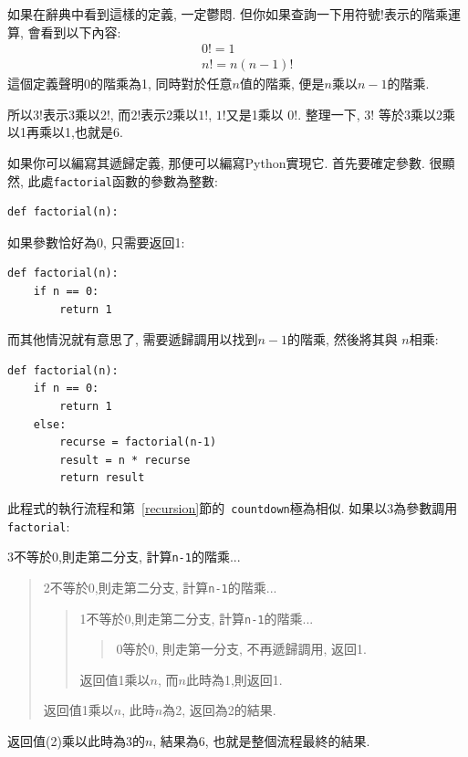 \documentclass[10pt]{book}
\begin{document}
如果在辭典中看到這樣的定義, 一定鬱悶. 
但你如果查詢一下用符號$!$表示的階乘運算, 
會看到以下內容:
%
\begin{eqnarray*}
&&  0! = 1 \\
&&  n! = n (n-1)!
\end{eqnarray*}
%
這個定義聲明0的階乘為1, 同時對於任意$n$值的階乘, 便是$n$乘以$n-1$的階乘. 

所以$3!$表示3乘以$2!$,  而$2!$表示2乘以$1!$, $1!$又是1乘以
$0!$. 整理一下, $3!$ 等於3乘以2乘以1再乘以1,也就是6.

如果你可以編寫其遞歸定義, 那便可以編寫Python實現它. 
首先要確定參數. 很顯然, 此處{\tt factorial}函數的參數為整數:

\begin{verbatim}
def factorial(n):
\end{verbatim}
%
如果參數恰好為0, 只需要返回1:

\begin{verbatim}
def factorial(n):
    if n == 0:
        return 1
\end{verbatim}
%
而其他情況就有意思了, 需要遞歸調用以找到$n-1$的階乘, 然後將其與
$n$相乘:

\begin{verbatim}
def factorial(n):
    if n == 0:
        return 1
    else:
        recurse = factorial(n-1)
        result = n * recurse
        return result
\end{verbatim}
%
此程式的執行流程和第~\ref{recursion}節的{\tt
countdown}極為相似. 如果以3為參數調用{\tt factorial}:

3不等於0,則走第二分支, 計算{\tt n-1}的階乘...

\begin{quote}
2不等於0,則走第二分支, 計算{\tt n-1}的階乘...


  \begin{quote}
 1不等於0,則走第二分支, 計算{\tt n-1}的階乘...


    \begin{quote}
   0等於0, 則走第一分支, 不再遞歸調用, 返回1.
    \end{quote}

  返回值1乘以$n$, 而$n$此時為1,則返回1. 
  \end{quote}

返回值1乘以$n$, 此時$n$為2, 返回為2的結果.
\end{quote}

返回值(2)乘以此時為3的$n$, 結果為6, 也就是整個流程最終的結果. 
\end{document}

